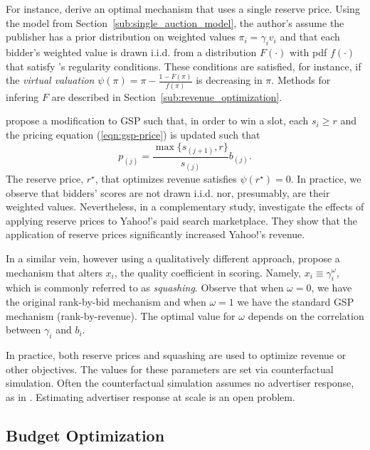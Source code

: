 \documentclass[prodmode,acmtist]{acmsmall} %
\begin{document}
For instance,  derive an optimal mechanism that uses a single reserve price.
Using the model from Section~\ref{sub:single_auction_model}, the author's assume the publisher has a prior distribution on weighted values $\pi_i = \gamma_i v_i$ and that each bidder's weighted value is drawn i.i.d. from a distribution $F(\cdot)$ with pdf $f(\cdot)$ that satisfy 's regularity conditions.
These conditions are satisfied, for instance, if the \emph{virtual valuation} $\psi(\pi) = \pi - \frac{1 - F(\pi)}{f(\pi)}$ is decreasing in $\pi$.
Methods for infering $F$ are described in Section~\ref{sub:revenue_optimization}.

 propose a modification to GSP such that, in order to win a slot, each $s_i \ge r$ and the pricing equation (\ref{eqn:gsp-price}) is updated such that
\begin{equation}
p_{(j)} = \frac{\max\{s_{(j+1)},r\}}{s_{(j)}} b_{(j)}.
\label{eqn:gsp-reserve-price}	
\end{equation}
The reserve price, $r^\star$, that optimizes revenue satisfies $\psi(r^\star) = 0$.
In practice, we observe that bidders' scores are not drawn i.i.d. nor, presumably, are their weighted values.
Nevertheless, in a complementary study,  investigate the effects of applying reserve prices to Yahoo!'s paid search marketplace.  
They show that the application of reserve prices significantly increased Yahoo!'s revenue.

In a similar vein, however using a qualitatively different approach,  propose a mechanism that alters $x_i$, the quality coefficient in scoring.
Namely, $x_i \equiv \gamma_i^\omega$, which is commonly referred to as \emph{squashing}.
Observe that when $\omega = 0$, we have the original rank-by-bid mechanism and when $\omega = 1$ we have the standard GSP mechanism (rank-by-revenue).
The optimal value for $\omega$ depends on the correlation between $\gamma_i$ and $b_i$.

In practice, both reserve prices and squashing are used to optimize revenue or other objectives.
The values for these parameters are set via counterfactual simulation.
Often the counterfactual simulation assumes no advertiser response, as in .
Estimating advertiser response at scale is an open problem.


\subsection{Budget Optimization} %
\label{sub:budget_optimization}
\end{document}
